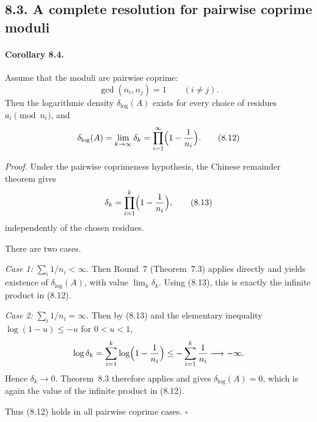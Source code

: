 \subsection*{8.3. A complete resolution for pairwise coprime moduli}
\paragraph{Corollary 8.4.}
Assume that the moduli are pairwise coprime:
\begin{equation}
\gcd(n_i,n_j)=1\qquad(i\neq j).
\tag{8.11}
\end{equation}
Then the logarithmic density $\delta_{\log}(A)$ exists for every choice of residues $a_i\pmod{n_i}$, and
\begin{equation}
\delta_{\log}(A)
=
\lim_{k\to\infty}\delta_k
=
\prod_{i=1}^{\infty}\Bigl(1-\frac1{n_i}\Bigr).
\tag{8.12}
\end{equation}

\emph{Proof.}
Under the pairwise coprimeness hypothesis, the Chinese remainder theorem gives
\begin{equation}
\delta_k=
\prod_{i=1}^{k}\Bigl(1-\frac1{n_i}\Bigr),
\tag{8.13}
\end{equation}
independently of the chosen residues.

There are two cases.

\smallskip
\noindent
\emph{Case 1:} $\sum_i 1/n_i<\infty$.
Then Round~7 (Theorem~7.3) applies directly and yields existence of $\delta_{\log}(A)$, with value
\(
\lim_k \delta_k
\).
Using (8.13), this is exactly the infinite product in (8.12).

\smallskip
\noindent
\emph{Case 2:} $\sum_i 1/n_i=\infty$.
Then by (8.13) and the elementary inequality $\log(1-u)\le -u$ for $0<u<1$,
\[
\log \delta_k
=
\sum_{i=1}^{k}\log\Bigl(1-\frac1{n_i}\Bigr)
\le
-\sum_{i=1}^{k}\frac1{n_i}
\longrightarrow -\infty.
\]
Hence $\delta_k\to 0$.
Theorem~8.3 therefore applies and gives $\delta_{\log}(A)=0$, which is again the value of the infinite product in (8.12).

Thus (8.12) holds in all pairwise coprime cases. \hfill $\square$

